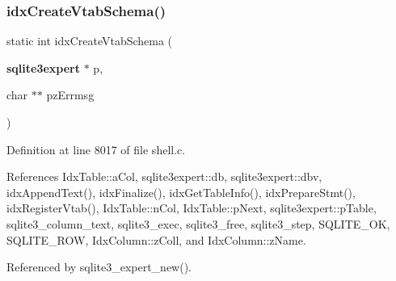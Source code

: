 \subsubsection{idx\+Create\+Vtab\+Schema()}
{\footnotesize\ttfamily static int idx\+Create\+Vtab\+Schema (\begin{DoxyParamCaption}\item[{\textbf{ sqlite3expert} $\ast$}]{p,  }\item[{char $\ast$$\ast$}]{pz\+Errmsg }\end{DoxyParamCaption})\hspace{0.3cm}{\ttfamily [static]}}



Definition at line 8017 of file shell.\+c.



References Idx\+Table\+::a\+Col, sqlite3expert\+::db, sqlite3expert\+::dbv, idx\+Append\+Text(), idx\+Finalize(), idx\+Get\+Table\+Info(), idx\+Prepare\+Stmt(), idx\+Register\+Vtab(), Idx\+Table\+::n\+Col, Idx\+Table\+::p\+Next, sqlite3expert\+::p\+Table, sqlite3\+\_\+column\+\_\+text, sqlite3\+\_\+exec, sqlite3\+\_\+free, sqlite3\+\_\+step, S\+Q\+L\+I\+T\+E\+\_\+\+OK, S\+Q\+L\+I\+T\+E\+\_\+\+R\+OW, Idx\+Column\+::z\+Coll, and Idx\+Column\+::z\+Name.



Referenced by sqlite3\+\_\+expert\+\_\+new().


